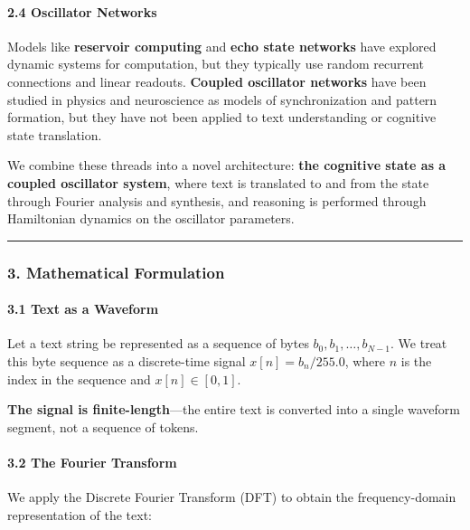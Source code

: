 \documentclass[
  11pt,
  a4paper,
]{article}
\begin{document}
\paragraph{2.4 Oscillator Networks}\label{oscillator-networks}

Models like \textbf{reservoir computing} and \textbf{echo state
networks} have explored dynamic systems for computation, but they
typically use random recurrent connections and linear readouts.
\textbf{Coupled oscillator networks} have been studied in physics and
neuroscience as models of synchronization and pattern formation, but
they have not been applied to text understanding or cognitive state
translation.

We combine these threads into a novel architecture: \textbf{the
cognitive state as a coupled oscillator system}, where text is
translated to and from the state through Fourier analysis and synthesis,
and reasoning is performed through Hamiltonian dynamics on the
oscillator parameters.

\begin{center}\rule{0.5\linewidth}{0.5pt}\end{center}

\subsubsection{3. Mathematical
Formulation}\label{mathematical-formulation-4}

\paragraph{3.1 Text as a Waveform}\label{text-as-a-waveform}

Let a text string be represented as a sequence of bytes
\(b_0, b_1, \dots, b_{N-1}\). We treat this byte sequence as a
discrete-time signal \(x[n] = b_n / 255.0\), where \(n\) is the index in
the sequence and \(x[n] \in [0, 1]\).

\textbf{The signal is finite-length}---the entire text is converted into
a single waveform segment, not a sequence of tokens.

\paragraph{3.2 The Fourier Transform}\label{the-fourier-transform}

We apply the Discrete Fourier Transform (DFT) to obtain the
frequency-domain representation of the text:
\end{document}
